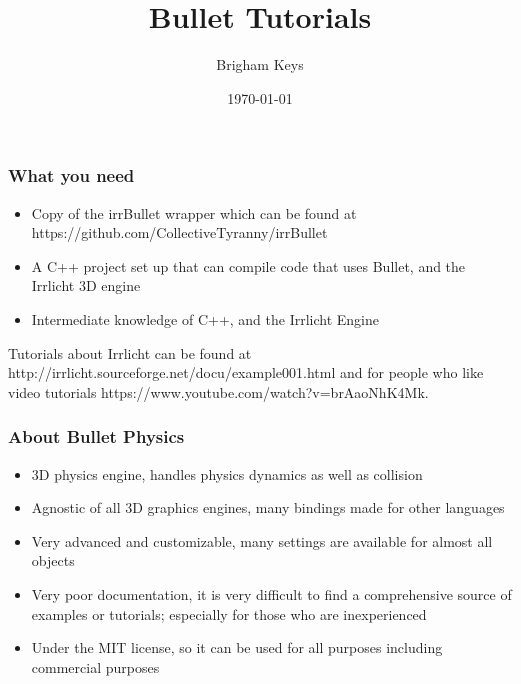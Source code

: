 \documentclass{beamer}
\title[Bullet Noob and the Quest for the Holy Grail]{Bullet Tutorials} %
\author{Brigham Keys} %
\institute[Collective Tyranny] %
{
Collective Tyranny
\medskip
\textit{bkeys@bkeys.org} %
}
\date{\today} %
\begin{document}
\begin{frame}
\titlepage %
\end{frame}



\begin{frame}
\frametitle{What you need}
\begin{itemize}
\item Copy of the irrBullet wrapper which can be found at https://github.com/CollectiveTyranny/irrBullet
\item A C++ project set up that can compile code that uses Bullet, and the Irrlicht 3D engine
\item Intermediate knowledge of C++, and the Irrlicht Engine
\end{itemize}
Tutorials about Irrlicht can be found at http://irrlicht.sourceforge.net/docu/example001.html and for people who like video tutorials https://www.youtube.com/watch?v=brAaoNhK4Mk.
\end{frame}


\begin{frame}
\frametitle{About Bullet Physics}
\begin{itemize}
\item 3D physics engine, handles physics dynamics as well as collision
\item Agnostic of all 3D graphics engines, many bindings made for other languages
\item Very advanced and customizable, many settings are available for almost all objects
\item Very poor documentation, it is very difficult to find a comprehensive source of examples or tutorials; especially for those who are inexperienced
\item Under the MIT license, so it can be used for all purposes including commercial purposes
\end{itemize}
\end{frame}

\end{document}
